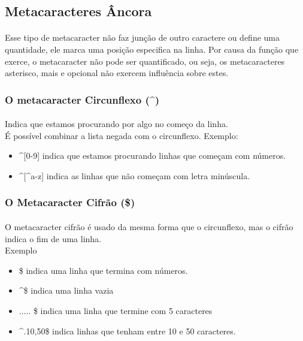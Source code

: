\documentclass[10pt,a4paper]{article}
\newcommand{\circunflexo}{\textasciicircum}
\begin{document}
\subsection{Metacaracteres Âncora}
\paragraph*{}
Esse tipo de metacaracter não faz junção de outro caractere ou define uma quantidade, ele marca uma posição especifica na linha. Por causa da função que exerce, o metacaracter não pode ser quantificado, ou seja, os metacaracteres asterisco, mais e opcional não exercem influência sobre estes.
\subsubsection{O metacaracter Circunflexo (\circunflexo)}
\paragraph*{}
Indica que estamos procurando por algo no começo da  linha.\\
É possível combinar a lista negada com o circunflexo.
Exemplo:
\begin{itemize}
\item \circunflexo[0-9] indica que estamos procurando linhas que começam com números.\\
\item \circunflexo [\circunflexo a-z] indica as linhas que não começam com letra minúscula.
\end{itemize}
\subsubsection{O Metacaracter Cifrão (\$)}
\paragraph*{}
O metacaracter cifrão é usado da mesma forma que o circunflexo, mas o cifrão indica o fim de uma linha.\\
Exemplo
\begin{itemize}
\item [0-9]\$ indica uma linha que termina com números.
\item \circunflexo \$ indica  uma linha vazia
\item ..... \$ indica uma linha que termine com 5 caracteres
\item \circunflexo.{10,50}\$ indica linhas que tenham entre 10 e 50 caracteres.
\end{itemize}
\end{document}
